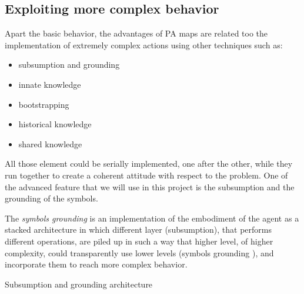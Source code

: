 \subsection{Exploiting more complex behavior}
Apart the basic behavior, the advantages of PA maps are related too the implementation of extremely complex actions using other techniques such as:
\begin{itemize}
\item subsumption and grounding
\item innate knowledge
\item bootstrapping
\item historical knowledge
\item shared knowledge
\end{itemize}
All those element could be serially implemented, one after the other, while they run together to create a coherent attitude with respect to the problem. One of the advanced feature that we will use in this project is the subsumption and the grounding of the symbols.

The \emph{symbols grounding} is an implementation of the embodiment of the agent as a stacked architecture in which different layer (subsumption), that performs different operations, are piled up in such a way that higher level, of higher complexity, could transparently use lower levels (symbols grounding \citep{harnad1990symbolgrounding}), and incorporate them to reach more complex behavior.
\begin{marginfigure}
\caption{Subsumption and grounding architecture}
\end{marginfigure}

